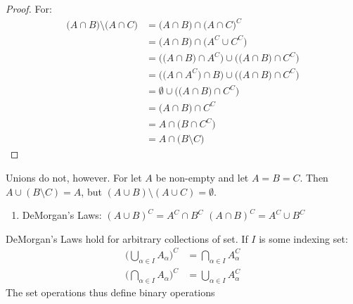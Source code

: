             \begin{proof}
                For:
                \begin{subequations}
                    \begin{align}
                        \big(A\cap{B}\big)\setminus\big(A\cap{C}\big)
                        &=\big(A\cap{B}\big)\cap\big(A\cap{C}\big)^{C}\\
                        &=\big(A\cap{B}\big)\cap\big(A^{C}\cup{C}^{C}\big)\\
                        &=\Big(\big(A\cap{B}\big)\cap{A}^{C}\Big)
                            \cup\Big(\big({A}\cap{B}\big)\cap{C}^{C}\Big)\\
                        &=\Big(\big(A\cap{A}^{C}\big)\cap{B}\Big)\cup
                            \Big(\big(A\cap{B}\big)\cap{C}^{C}\Big)\\
                        &=\emptyset\cup
                            \Big(\big(A\cap{B}\big)\cap{C}^{C}\Big)\\
                        &=\big(A\cap{B}\big)\cap{C}^{C}\\
                        &=A\cap\big(B\cap{C}^{C}\big)\\
                        &=A\cap\big(B\setminus{C}\big)
                    \end{align}
                \end{subequations}
            \end{proof}
            Unions do not, however. For let $A$ be non-empty and let
            $A=B=C$. Then $A\cup(B\setminus{C})=A$, but
            $(A\cup{B})\setminus(A\cup{C})=\emptyset$.
            \begin{enumerate}
                \item DeMorgan's Laws:
                      \subitem $(A\cup{B})^{C}=A^{C}\cap{B}^{C}$
                      \subitem $(A\cap{B})^{C}=A^{C}\cup{B}^{C}$
            \end{enumerate}
            DeMorgan's Laws hold for arbitrary collections
            of set. If $I$ is some indexing set:
            \begin{align}
                \Big(\bigcup_{\alpha\in{I}}A_{\alpha}\Big)^{C}
                &=\bigcap_{\alpha\in{I}}A_{\alpha}^{C}\\
                \Big(\bigcap_{\alpha\in{I}}A_{\alpha}\Big)^{C}
                &=\bigcup_{\alpha\in{I}}A_{\alpha}^{C}
            \end{align}
            The set operations thus define binary operations
